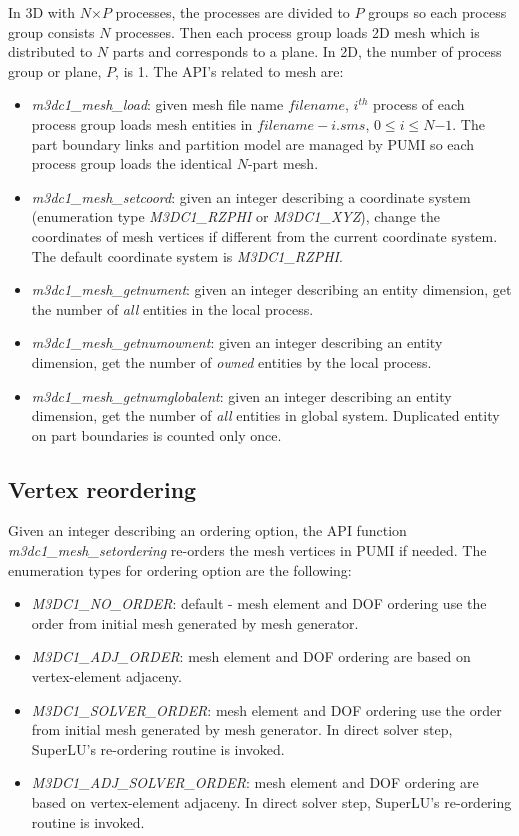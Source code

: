 \documentclass[11pt]{article}  %
\begin{document}
In 3D with $N$$\times$$P$ processes, the processes are divided to $P$ groups so each process group consists $N$ processes. Then each process group loads 2D mesh which is distributed to $N$ parts and corresponds to a plane. In 2D, the number of process group or plane, $P$, is 1. The API's related to mesh are:
\begin{itemize}
\item \emph{m3dc1\_mesh\_load}: given mesh file name $filename$, $i^{th}$ process of each process group loads mesh entities in $filename-i.sms$, $0$$\le$$i$$\le$$N$$-$$1$. The part boundary links and partition model are managed by PUMI so each process group loads the identical $N$-part mesh.
\item \emph{m3dc1\_mesh\_setcoord}: given an integer describing a coordinate system (enumeration type \emph{M3DC1\_RZPHI} or \emph{M3DC1\_XYZ}), change the coordinates of mesh vertices if different from the current coordinate system. The default coordinate system is \emph{M3DC1\_RZPHI}. 
\item \emph{m3dc1\_mesh\_getnument}: given an integer describing an entity dimension, get the number of \emph{all} entities in the local process.
\item \emph{m3dc1\_mesh\_getnumownent}: given an integer describing an entity dimension, get the number of \emph{owned} entities by the local process.
\item \emph{m3dc1\_mesh\_getnumglobalent}: given an integer describing an entity dimension, get the number of \emph{all} entities in global system. Duplicated entity on part boundaries is counted only once.
\end{itemize}

\subsection{Vertex reordering}\label{sec:step2}

Given an integer describing an ordering option, the API function \emph{m3dc1\_mesh\_setordering} re-orders the mesh vertices in PUMI if needed. The enumeration types for ordering option are the following:
\begin{itemize}
\item \emph{M3DC1\_NO\_ORDER}: default - mesh element and DOF ordering use the order from initial mesh generated by mesh generator.
\item \emph{M3DC1\_ADJ\_ORDER}: mesh element and DOF ordering are based on vertex-element adjaceny. 
\item \emph{M3DC1\_SOLVER\_ORDER}: mesh element and DOF ordering use the order from initial mesh generated by mesh generator. In direct solver step, SuperLU's re-ordering routine is invoked.
\item \emph{M3DC1\_ADJ\_SOLVER\_ORDER}: mesh element and DOF ordering are based on vertex-element adjaceny. In direct solver step, SuperLU's re-ordering routine is invoked.
\end{itemize}
\end{document}

